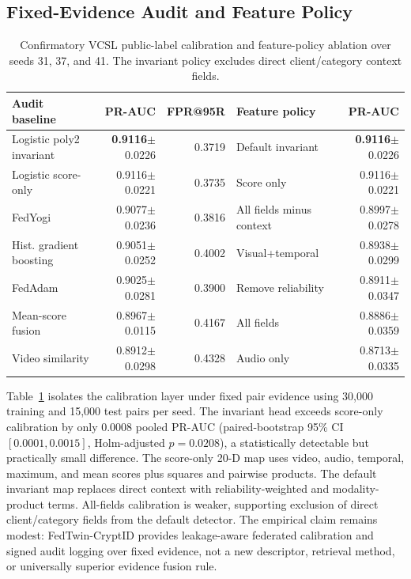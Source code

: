 \documentclass[journal]{IEEEtran}
\newcommand{\ours}{FedTwin-CryptID}
\begin{document}
\subsection{Fixed-Evidence Audit and Feature Policy}

\begin{table}[!t]
\centering
\caption{Confirmatory VCSL public-label calibration and feature-policy ablation over seeds 31, 37, and 41. The invariant policy excludes direct client/category context fields.}
\label{tab:audit-ablation}
\scriptsize
\begin{tabularx}{\textwidth}{p{} r r p{} r}
\toprule
Audit baseline & PR-AUC & FPR@95R & Feature policy & PR-AUC \\
\midrule
Logistic poly2 invariant & \textbf{0.9116}$\pm$0.0226 & 0.3719 & Default invariant & \textbf{0.9116}$\pm$0.0226 \\
Logistic score-only & 0.9116$\pm$0.0221 & 0.3735 & Score only & 0.9116$\pm$0.0221 \\
FedYogi & 0.9077$\pm$0.0236 & 0.3816 & All fields minus context & 0.8997$\pm$0.0278 \\
Hist. gradient boosting & 0.9051$\pm$0.0252 & 0.4002 & Visual+temporal & 0.8938$\pm$0.0299 \\
FedAdam & 0.9025$\pm$0.0281 & 0.3900 & Remove reliability & 0.8911$\pm$0.0347 \\
Mean-score fusion & 0.8967$\pm$0.0115 & 0.4167 & All fields & 0.8886$\pm$0.0359 \\
Video similarity & 0.8912$\pm$0.0298 & 0.4328 & Audio only & 0.8713$\pm$0.0335 \\
\bottomrule
\end{tabularx}
\end{table}

Table~\ref{tab:audit-ablation} isolates the calibration layer under fixed pair evidence using 30,000 training and 15,000 test pairs per seed. The invariant head exceeds score-only calibration by only 0.0008 pooled PR-AUC (paired-bootstrap 95\% CI $[0.0001,0.0015]$, Holm-adjusted $p=0.0208$), a statistically detectable but practically small difference. The score-only 20-D map uses video, audio, temporal, maximum, and mean scores plus squares and pairwise products. The default invariant map replaces direct context with reliability-weighted and modality-product terms. All-fields calibration is weaker, supporting exclusion of direct client/category fields from the default detector. The empirical claim remains modest: \ours{} provides leakage-aware federated calibration and signed audit logging over fixed evidence, not a new descriptor, retrieval method, or universally superior evidence fusion rule.
\end{document}
